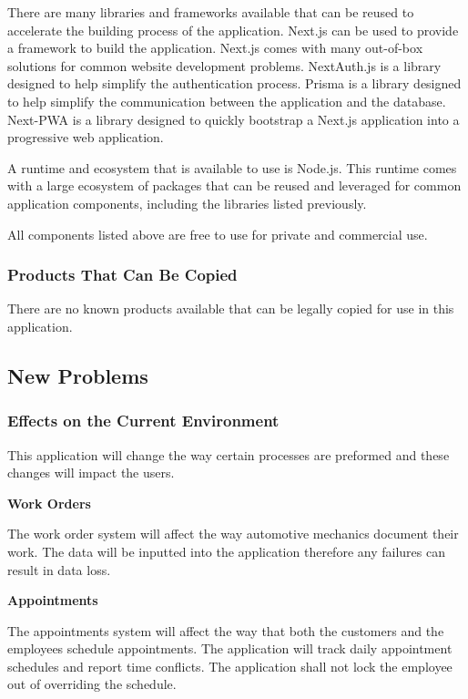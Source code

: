 \documentclass[12pt]{article}
\begin{document}
There are many libraries and frameworks available that can be reused to accelerate the building
process of the application. Next.js can be used to provide a framework to build the application.
Next.js comes with many out-of-box solutions for common website development problems. NextAuth.js
is a library designed to help simplify the authentication process. Prisma is a library designed to
help simplify the communication between the application and the database. Next-PWA is a library
designed to quickly bootstrap a Next.js application into a progressive web application.

A runtime and ecosystem that is available to use is Node.js. This runtime comes with a large
ecosystem of packages that can be reused and leveraged for common application components, including
the libraries listed previously.

All components listed above are free to use for private and commercial use.

\subsubsection{Products That Can Be Copied}

There are no known products available that can be legally copied for use in this application.

\subsection{New Problems}

\subsubsection{Effects on the Current Environment}

This application will change the way certain processes are preformed and these changes will impact
the users.

\textbf{Work Orders}

The work order system will affect the way automotive mechanics document their work. The data will
be inputted into the application therefore any failures can result in data loss.

\textbf{Appointments}

The appointments system will affect the way that both the customers and the employees schedule
appointments. The application will track daily appointment schedules and report time conflicts. The
application shall not lock the employee out of overriding the schedule.
\end{document}
